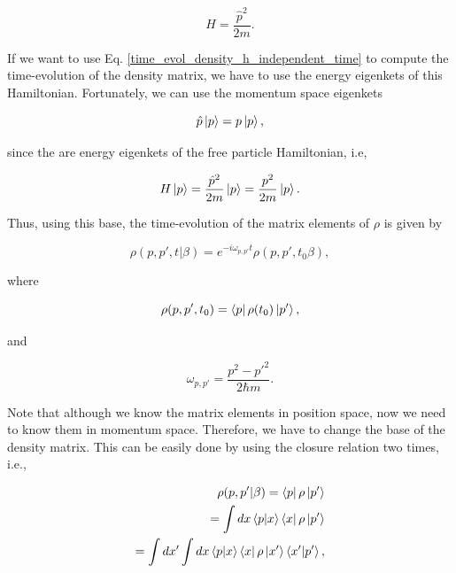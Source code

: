 \documentclass{article}
\begin{document}
\begin{equation*}
    H = \frac{\hat{p}^{2}}{2m}.
\end{equation*}

If we want to use Eq. \ref{time_evol_density_h_independent_time} to compute the time-evolution of the density matrix, we have to use the energy eigenkets of this Hamiltonian. Fortunately, we can use the momentum space eigenkets

\begin{equation}
    \hat{p}\ket{p} = p \ket{p},
\end{equation}

since the are energy eigenkets of the free particle Hamiltonian, i.e,

\begin{equation}
   H \ket{p} = \frac{\hat{p}^{2}}{2m} \ket{p} = \frac{p^{2}}{2m} \ket{p}.
\end{equation}

Thus, using this base, the time-evolution of the matrix elements of $\rho$ is given by

\begin{equation}\label{time_evo_energy_eigenkets}
    \rho(p,p',t|\beta) = e^{-i\omega_{p,p'}t} \rho(p,p',t_{0}\beta),
\end{equation}

where

\begin{equation}
    \rho(p,p',t_{0}) = \bra{p} \rho(t_{0}) \ket{p'},
\end{equation}

and

\begin{equation}\label{freq_omega_no_gravity}
    \omega_{p,p'} = \frac{p^{2}-p'^{2}}{2\hbar m}.
\end{equation}

Note that although we know the matrix elements in position space, now we need to know them in momentum space. Therefore, we have to change the base of the density matrix. This can be easily done by using the closure relation two times, i.e.,

\begin{equation}
    \begin{split}
        \rho(p,p'|\beta) = \bra{p} \rho \ket{p'} \\ = \int dx \braket{p|x} \bra{x} \rho \ket{p'} \\ =\int dx' \int dx \braket{p|x} \bra{x} \rho \ket{x'} \braket{x'|p'},
    \end{split}
\end{equation}
\end{document}
